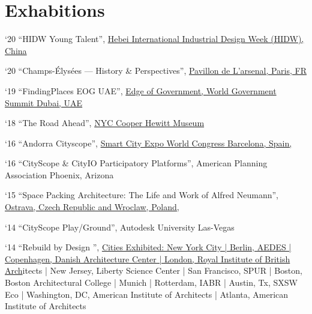 \section*{Exhabitions}

\begin{tablist}

\item[`20] \tab \enquote{HIDW Young Talent},
\href{http://hidw-en.aty.cn/activity/Default.aspx?id=10000069}{Hebei International Industrial Design Week (HIDW), China}

\item[`20] \tab \enquote{Champs-Élysées — History \& Perspectives},
\href{https://www.pavillon-arsenal.com/en/expositions/11463-champs-elysees.html}{Pavillon de L'arsenal, Paris, FR}

\item[`19] \tab \enquote{FindingPlaces EOG UAE},
\href{https://edge.worldgovernmentsummit.org}{Edge of Government, World Government Summit Dubai, UAE}

\item[`18] \tab \enquote{The Road Ahead},
\href{https://www.cooperhewitt.org/channel/road-ahead/}{NYC Cooper Hewitt Museum}

\item[`16] \tab \enquote{Andorra Cityscope},
\href{https://www.actua.ad/en/actualitat/andorran-projects-attract-international-attention-smart-city-expo-world-congress}{Smart City Expo World Congress Barcelona, Spain,}

\item[`16] \tab \enquote{CityScope \& CityIO Participatory Platforms},
American Planning Association Phoenix, Arizona

\item[`15] \tab \enquote{Space Packing Architecture: The Life and Work of Alfred Neumann},
\href{https://www.archdaily.com/633053/space-packing-architecture-the-life-and-work-of-alfred-neumann?ad_medium=gallery}{Ostrava, Czech Republic and Wroclaw, Poland,}

\item[`14] \tab \enquote{CityScope Play/Ground},
Autodesk University Las-Vegas

\item[`14] \tab \enquote{Rebuild by Design },
\href{http://www.rebuildbydesign.org/news-and-events/exhibitions/rebuild-by-design-hurricane-sandy-design-competition-exhibition}{Cities Exhibited: New York City | Berlin, AEDES | Copenhagen, Danish Architecture Center | London, Royal Institute of British Arch}itects | New Jersey, Liberty Science Center | San Francisco, SPUR | Boston, Boston Architectural College | Munich | Rotterdam, IABR | Austin, Tx, SXSW Eco | Washington, DC, American Institute of Architects | Atlanta, American Institute of Architects


\end{tablist}
